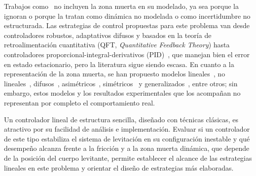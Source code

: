 \begin{sloppypar}
Trabajos como~\cite{khimani,mukesh,neelma} no incluyen la zona muerta en su modelado, ya sea porque la ignoran o porque la tratan como dinámica no modelada o como incertidumbre no estructurada. Las estrategias de control propuestas para este problema van desde controladores robustos, adaptativos difusos y basados en la teoría de retroalimentación cuantitativa (QFT, \emph{Quantitative Feedback Theory}) hasta controladores proporcional-integral-derivativos (PID)~\cite{kuo1,mukesh,maaz}, que manejan bien el error en estado estacionario, pero la literatura sigue siendo escasa. En cuanto a la representación de la zona muerta, se han propuesto modelos lineales~\cite{salim}, no lineales~\cite{huanqing}, difusos~\cite{zhi}, asimétricos~\cite{gang}, simétricos~\cite{nizar} y generalizados~\cite{guanyu}, entre otros; sin embargo, estos modelos y los resultados experimentales que los acompañan no representan por completo el comportamiento real.

Un controlador lineal de estructura sencilla, diseñado con técnicas clásicas, es atractivo por su facilidad de análisis e implementación. Evaluar si un controlador de este tipo estabiliza el sistema de levitación en su configuración inestable y qué desempeño alcanza frente a la fricción y a la zona muerta dinámica, que depende de la posición del cuerpo levitante, permite establecer el alcance de las estrategias lineales en este problema y orientar el diseño de estrategias más elaboradas.

\end{sloppypar}
